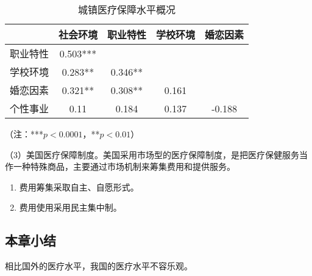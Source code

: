 \begin{table}[H]
  \centering
  \caption{城镇医疗保障水平概况}
  \begin{threeparttable}
    \begin{tabular}{p{4.19em}cccc}
    \hline
    \multicolumn{1}{r}{} & \multicolumn{1}{l}{社会环境} & \multicolumn{1}{l}{职业特性} & \multicolumn{1}{l}{学校环境} & \multicolumn{1}{l}{婚恋因素} \bigstrut\\
    \hline
    职业特性  & 0.503*** &       &       &  \\
    学校环境  & 0.283** & 0.346** &       &  \\
    婚恋因素  & 0.321** & 0.308** & 0.161 &  \\
    个性事业  & 0.11  & 0.184 & 0.137 & -0.188 \\
    \hline
    \end{tabular}%
    \begin{tablenotes}
      \item{（注：***$p<0.0001$，**$p<0.01$）}
    \end{tablenotes}
  \end{threeparttable}
  \label{tab:城镇医疗保障水平概况}%
\end{table}%

（3）美国医疗保障制度。美国采用市场型的医疗保障制度，是把医疗保健服务当作一种特殊商品，主要通过市场机制来筹集费用和提供服务。

\begin{enumerate}[label=\textcircled{\footnotesize\arabic*}]
  \item{费用筹集采取自主、自愿形式。}
  \item{费用使用采用民主集中制。}
\end{enumerate}



\subsection{本章小结}

相比国外的医疗水平，我国的医疗水平不容乐观。


